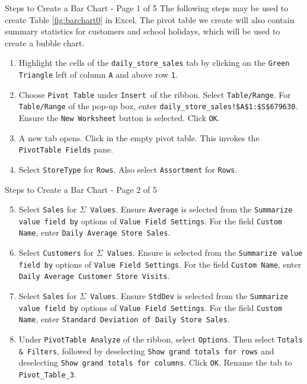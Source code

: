\documentclass[pdf]{beamer}
\theoremstyle{remark}
\theoremstyle{definition}
\begin{document}
\begin{frame}[t]{Steps to Create a Bar Chart - Page 1 of 5}
   The following steps may be used to create Table \ref{fig:barchart0} in Excel. The pivot table we create will also contain summary statistics for customers and school holidays, which will be used to create a bubble chart. \\
\vspace{0.5ex}
\small
\begin{enumerate}
 \item  Highlight the cells of the \texttt{daily\_store\_sales} tab by clicking on the \texttt{Green Triangle} left of column \texttt{A} and above row \texttt{1}.
 \item Choose \texttt{Pivot Table} under \texttt{Insert }of the ribbon. Select \texttt{Table/Range}.  For \texttt{Table/Range} of the pop-up box, enter \texttt{daily\_store\_sales!\$A\$1:\$S\$679630}. Ensure the \texttt{New Worksheet} button is selected.  Click \texttt{OK}.
\item A new tab opens.  Click in the empty pivot table.  This invokes the \texttt{PivotTable Fields} pane. 
\item Select \texttt{StoreType} for \texttt{Rows}. Also select \texttt{Assortment} for \texttt{Rows}. 
\end{enumerate}
\end{frame}

\begin{frame}[t]{Steps to Create a Bar Chart - Page 2 of 5}
 \small 
\begin{enumerate}
  \setcounter{enumi}{4}
\item Select \texttt{Sales} for \texttt{$\Sigma$ Values}. Ensure \texttt{Average} is selected from the \texttt{Summarize value field by} options of \texttt{Value Field Settings}.  For the field \texttt{Custom Name}, enter \texttt{Daily Average Store Sales}.
\item Select \texttt{Customers} for \texttt{$\Sigma$ Values}. Ensure \texttt{} is selected from the \texttt{Summarize value field by} options of \texttt{Value Field Settings}.  For the field \texttt{Custom Name}, enter \texttt{Daily Average Customer Store Visits}.
\item Select \texttt{Sales} for \texttt{$\Sigma$ Values}. Ensure \texttt{StdDev} is selected from the \texttt{Summarize value field by} options of \texttt{Value Field Settings}.  For the field \texttt{Custom Name}, enter \texttt{Standard Deviation of Daily Store Sales}.
\item Under \texttt{PivotTable Analyze} of the ribbon, select \texttt{Options}.  Then select \texttt{Totals \& Filters}, followed by deselecting \texttt{Show grand totals for rows} and deselecting \texttt{Show grand totals for columns}. Click \texttt{OK}.  Rename the tab to \texttt{Pivot\_Table\_3}.
\end{enumerate}
\end{frame}
\end{document}
